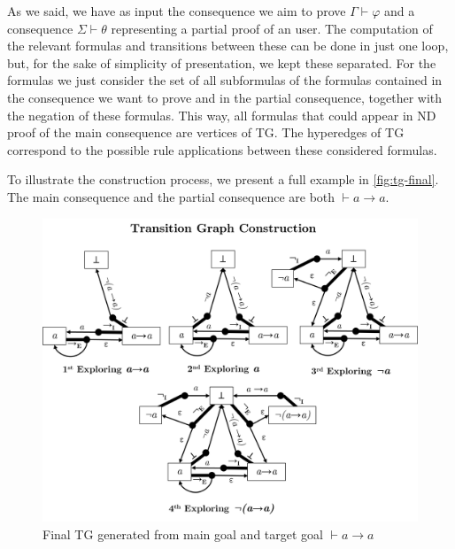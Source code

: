 As we said, we have as input the consequence we aim to prove \(\Gamma \vdash \varphi\) and a consequence \(\Sigma \vdash \theta\) representing a partial proof of an user. The computation of the relevant formulas and transitions between these can be done in just one loop, but, for the sake of simplicity of presentation, we kept these separated. For the formulas we just consider the set of all subformulas of the formulas contained in the consequence we want to prove and in the partial consequence, together with the negation of these formulas. This way, all formulas that could appear in ND proof of the main consequence are vertices of TG.
The hyperedges of TG correspond to the possible rule applications between these considered formulas.


To illustrate the construction process, we present a full example in \autoref{fig:tg-final}. The main consequence and the partial consequence are both \(\vdash a \to a\).
\begin{figure}[h]
    \centering
    \includegraphics[width=0.8\linewidth]{resources/tg-final.png}
    \caption{Final TG generated from main goal and target goal \(\vdash a \to a\)}
    \label{fig:tg-final}
\end{figure}

